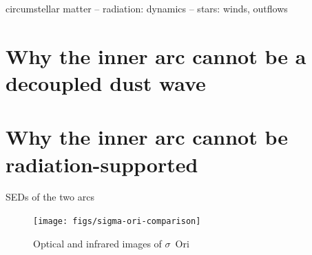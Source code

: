 \documentclass[useAMS, usenatbib, a4paper]{mnras}
\title
{\boldmath Bow shocks, bow waves, and dust waves. V. No dust wave for \(\sigma\) Ori}
\author[Henney \& Arthur]{
  William J. Henney \& S. Jane Arthur\\
  \AddressCRyA
}
\date{Accepted XXX. Received YYY; in original form ZZZ}
\newcommand\hii{\ion{H}{ii}}
\begin{document}
\label{firstpage}
\pagerange{\pageref{firstpage}--\pageref{lastpage}}
\maketitle
\begin{abstract}
  We critically evaluate the role of radiation and hydrodynamics in
  providing internal support for the bow-shaped infrared arc around
  the massive triple star system \(\sigma\)~Ori Aa/Ab/B in the IC434 \hii{}
  region.  We present evidence for hydrogen recombination line
  emission from the arc, which demonstrates that it cannot be a
  decoupled dust wave, as has previously been claimed.  On the other
  hand, we show that the fraction of the stellar luminosity trapped by
  the arc is insufficient for it to be supported by radiation if the
  grains and gas are well coupled.  Therefore, the arc must be
  supported by the ram pressure of an internal wind.  However, the
  stellar winds from the OB stars in the \(\sigma\)~Ori Aa/Ab/B system seem
  too weak to provide this support on their own.  We propose instead
  that it is the photoevaporated disk wind from the enclosed proplyd
  IRS~1B that dominates the ram pressure support for the bow.
\end{abstract}

\begin{keywords}
  circumstellar matter -- radiation: dynamics -- stars: winds, outflows
\end{keywords}

\section{Why the inner arc cannot be a decoupled dust wave}
\label{sec:why-not-dust}

\section{Why the inner arc cannot be radiation-supported}
\label{sec:why-not-radiation}

SEDs of the two arcs

\begin{figure}
  \centering
  \texttt{[image: figs/sigma-ori-comparison]}
  \caption{Optical and infrared images of $\sigma$~Ori}
  \label{fig:sig-ori}
\end{figure}
\end{document}
